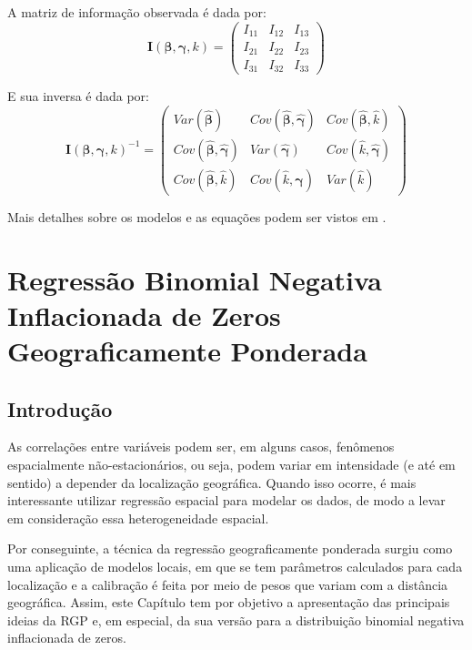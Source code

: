 \documentclass[12pt, a4paper, twoside]{report}
\numberwithin{equation}{section} %
\begin{document}
A matriz de informação observada é dada por:
\begin{equation}
\boldsymbol{I}(\boldsymbol{\beta},\boldsymbol{\gamma},k)=\begin{pmatrix}
I_{11} & I_{12} & I_{13}\\
I_{21} & I_{22} & I_{23}\\
I_{31} & I_{32} & I_{33}
\label{matriz_informacao}
\end{pmatrix}
\end{equation}

E sua inversa é dada por:
\begin{equation}
\boldsymbol{I}(\boldsymbol{\beta},\boldsymbol{\gamma},k)^{-1}=\begin{pmatrix}
Var(\boldsymbol{\hat{\beta}}) & Cov(\boldsymbol{\hat{\beta}},\boldsymbol{\hat{\gamma}}) & Cov(\boldsymbol{\hat{\beta}},\hat{k})\\
Cov(\boldsymbol{\hat{\beta}},\boldsymbol{\hat{\gamma}}) & Var(\boldsymbol{\hat{\gamma}}) & Cov(\hat{k},\boldsymbol{\hat{\gamma}})\\
Cov(\boldsymbol{\hat{\beta}},\hat{k}) & Cov(\hat{k},\boldsymbol{\hat{\gamma}}) & Var(\hat{k})
\label{matriz_informacao_inversa}
\end{pmatrix}
\end{equation}

Mais detalhes sobre os modelos e as equações podem ser vistos em \cite{sousa2022}.

\chapter{Regressão Binomial Negativa Inflacionada de Zeros Geograficamente Ponderada}\label{capitulo_3}
\section{Introdução}

As correlações entre variáveis podem ser, em alguns casos, fenômenos espacialmente não-estacionários, ou seja, podem variar em intensidade (e até em sentido) a depender da localização geográfica. Quando isso ocorre, é mais interessante utilizar regressão espacial para modelar os dados, de modo a levar em consideração essa heterogeneidade espacial.

Por conseguinte, a técnica da regressão geograficamente ponderada surgiu como uma aplicação de modelos locais, em que se tem parâmetros calculados para cada localização e a calibração é feita por meio de pesos que variam com a distância geográfica. Assim, este Capítulo tem por objetivo a apresentação das principais ideias da RGP e, em especial, da sua versão para a distribuição binomial negativa inflacionada de zeros.
\end{document}
